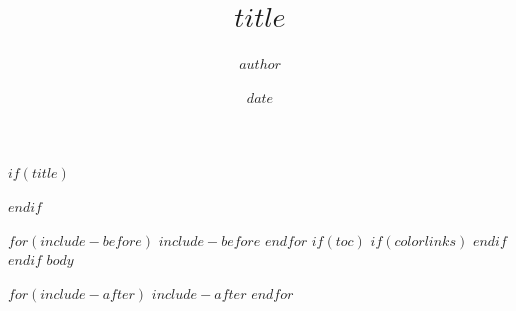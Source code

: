 \documentclass[]{article}
\title{$title$}
\author{$author$}
\date{$date$}
\begin{document}
$if(title)$
\maketitle
$endif$

$for(include-before)$
$include-before$
$endfor$
$if(toc)$
{
$if(colorlinks)$
\hypersetup{linkcolor=$if(toccolor)$$toccolor$$else$black$endif$}
$endif$
\setcounter{tocdepth}{$toc-depth$}
\tableofcontents
}
$endif$
$body$

$for(include-after)$
$include-after$
$endfor$
\end{document}
